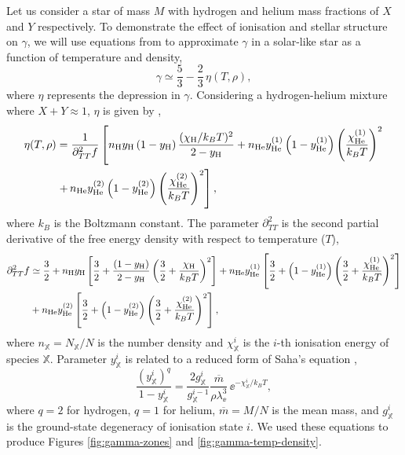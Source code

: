 Let us consider a star of mass \(M\) with hydrogen and helium mass fractions of \(X\) and \(Y\) respectively. To demonstrate the effect of ionisation and stellar structure on \(\gamma\), we will use equations from \citet{Houdayer.Reese.ea2021} to approximate \(\gamma\) in a solar-like star as a function of temperature and density,
%
\begin{equation}
    \gamma \simeq \frac{5}{3} - \frac{2}{3} \, \eta(T, \rho), \label{eq:gamma1}
\end{equation}
%
where \(\eta\) represents the depression in \(\gamma\). Considering a hydrogen-helium mixture where \(X + Y \approx 1\), \(\eta\) is given by \citep[cf.][]{Houdayer.Reese.ea2021},
%
\begin{equation}
    \begin{split}
        \eta(T, \rho) &= \frac{1}{\partial_{TT}^2 f} \left[n_{{\mathrm{H}}} y_{{\mathrm{H}}} \, (1 - y_{{\mathrm{H}}}) \, \frac{(\chi_{{\mathrm{H}}} / k_B T)^2}{2 - y_{{\mathrm{H}}}}
        + n_{{\mathrm{He}}} y_{{\mathrm{He}}}^{(1)} \left(1 - y_{{\mathrm{He}}}^{(1)}\right) \left(\frac{\chi_{{\mathrm{He}}}^{(1)}}{k_B T}\right)^2 
        \right. \\ &\left.
        + \, n_{{\mathrm{He}}} y_{{\mathrm{He}}}^{(2)} \left(1 - y_{{\mathrm{He}}}^{(2)}\right) \left(\frac{\chi_{{\mathrm{He}}}^{(2)}}{k_B T}\right)^2\right],
    \end{split}
\end{equation}
%
where \(k_B\) is the Boltzmann constant. The parameter \(\partial_{TT}^2\) is the second partial derivative of the free energy density with respect to temperature (\(T\)),
%
\begin{equation}
    \begin{split}
        \partial_{TT}^2 f &\simeq \frac{3}{2} + n_\hydrogen y_\hydrogen \left[ \frac{3}{2} + \frac{(1 - y_\hydrogen)}{2 - y_\hydrogen} \left(\frac{3}{2} + \frac{\chi_\hydrogen}{k_B T}\right)^2 \right] %
        + n_\helium y_\helium^{(1)} \left[ \frac{3}{2} + \left(1 - y_\helium^{(1)}\right) \left(\frac{3}{2} + \frac{\chi_\helium^{(1)}}{k_B T}\right)^2 \right] \\
        &+ n_\helium y_\helium^{(2)} \left[ \frac{3}{2} + \left(1 - y_\helium^{(2)}\right) \left(\frac{3}{2} + \frac{\chi_\helium^{(2)}}{k_B T}\right)^2 \right],
    \end{split}
\end{equation}
%
where \(n_\mathbb{X} = N_\mathbb{X} / N\) is the number density and \(\chi_\mathbb{X}^{i}\) is the \(i\)-th ionisation energy of species \(\mathbb{X}\). Parameter \(y_\mathbb{X}^i\) is related to a reduced form of Saha's equation \needcite,
%
\begin{equation}
    \frac{(y_\mathbb{X}^i)^q}{1 - y_\mathbb{X}^i} = \frac{2 g_\mathbb{X}^i}{g_\mathbb{X}^{i-1}} \frac{\overline{m}}{\rho \lambda_\ee^3} \, \ee^{- \chi_\mathbb{X}^i / k_B T},
\end{equation}
%
where \(q = 2\) for hydrogen, \(q = 1\) for helium, \(\overline{m} = M/N\) is the mean mass, and \(g_\mathbb{X}^i\) is the ground-state degeneracy of ionisation state \(i\). We used these equations to produce Figures \ref{fig:gamma-zones} and \ref{fig:gamma-temp-density}.

